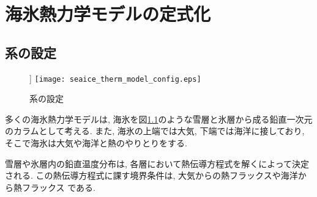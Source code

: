 \documentclass[a4j,12pt,openbib,oneside]{jreport}
\begin{document}
\chapter{海氷熱力学モデルの定式化}

\section{系の設定}
\begin{figure}[b]]
 \texttt{[image: seaice\_therm\_model\_config.eps]}
 \caption{系の設定}
 \label{fig:configuration}
\end{figure} 
多くの海氷熱力学モデル\citep{maykut1971some,semtner1976model,winton2000reformulated}は,
海氷を図\ref{fig:configuration}のような雪層と氷層から成る鉛直一次元のカラムとして考える. 
また, 海氷の上端では大気, 下端では海洋に接しており, 
そこで海氷は大気や海洋と熱のやりとりをする.

雪層や氷層内の鉛直温度分布は, 各層において熱伝導方程式を解くによって決定される.
この熱伝導方程式に課す境界条件は, 大気からの熱フラックスや海洋から熱フラックス
である. 






\end{document}
